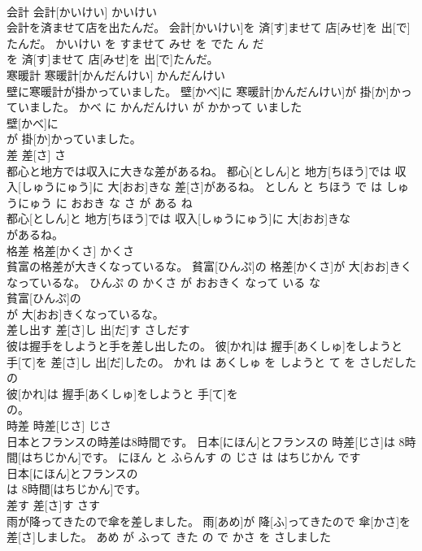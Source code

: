 \documentclass[8pt]{extreport}
\begin{document}
\begin{CJK}{UTF8}{min}
\\	会計	会計[かいけい]	かいけい	
\\	会計を済ませて店を出たんだ。	会計[かいけい]を 済[す]ませて 店[みせ]を 出[で]たんだ。	かいけい を すませて みせ を でた ん だ	
\\	を 済[す]ませて 店[みせ]を 出[で]たんだ。			
\\	寒暖計	寒暖計[かんだんけい]	かんだんけい	
\\	壁に寒暖計が掛かっていました。	壁[かべ]に 寒暖計[かんだんけい]が 掛[か]かっていました。	かべ に かんだんけい が かかって いました	
\\	壁[かべ]に
\\	が 掛[か]かっていました。			
\\	差	差[さ]	さ	
\\	都心と地方では収入に大きな差があるね。	都心[としん]と 地方[ちほう]では 収入[しゅうにゅう]に 大[おお]きな 差[さ]があるね。	としん と ちほう で は しゅうにゅう に おおき な さ が ある ね	
\\	都心[としん]と 地方[ちほう]では 収入[しゅうにゅう]に 大[おお]きな
\\	があるね。			
\\	格差	格差[かくさ]	かくさ	
\\	貧富の格差が大きくなっているな。	貧富[ひんぷ]の 格差[かくさ]が 大[おお]きくなっているな。	ひんぷ の かくさ が おおきく なって いる な	
\\	貧富[ひんぷ]の
\\	が 大[おお]きくなっているな。			
\\	差し出す	差[さ]し 出[だ]す	さしだす	
\\	彼は握手をしようと手を差し出したの。	彼[かれ]は 握手[あくしゅ]をしようと 手[て]を 差[さ]し 出[だ]したの。	かれ は あくしゅ を しようと て を さしだした の	
\\	彼[かれ]は 握手[あくしゅ]をしようと 手[て]を
\\	の。			
\\	時差	時差[じさ]	じさ	
\\	日本とフランスの時差は8時間です。	日本[にほん]とフランスの 時差[じさ]は 8時間[はちじかん]です。	にほん と ふらんす の じさ は はちじかん です	
\\	日本[にほん]とフランスの
\\	は 8時間[はちじかん]です。			
\\	差す	差[さ]す	さす	
\\	雨が降ってきたので傘を差しました。	雨[あめ]が 降[ふ]ってきたので 傘[かさ]を 差[さ]しました。	あめ が ふって きた の で かさ を さしました	

\end{CJK}
\end{document}

